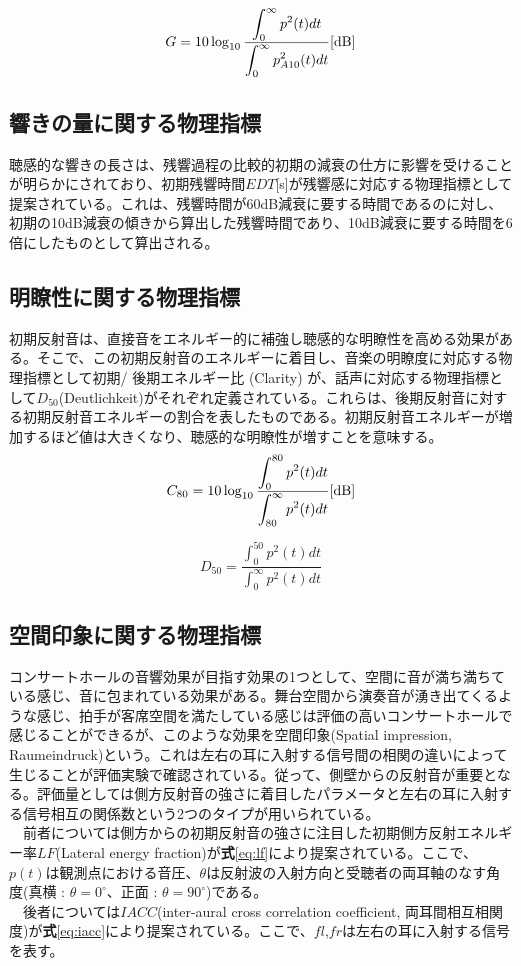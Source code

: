 \begin{equation}
  \label{eq:STG}
  G = 10\log_{10}{\frac{\displaystyle\int_0^{\infty}p^2(t)dt}{\displaystyle\int_0^{\infty}p_{A10}^2(t)dt}} \textrm{[dB]}
\end{equation}

\subsection{響きの量に関する物理指標}
聴感的な響きの長さは、残響過程の比較的初期の減衰の仕方に影響を受けることが明らかにされており、初期残響時間$EDT$[s]が残響感に対応する物理指標として提案されている。これは、残響時間が60dB減衰に要する時間であるのに対し、初期の10dB減衰の傾きから算出した残響時間であり、10dB減衰に要する時間を6倍にしたものとして算出される。

\subsection{明瞭性に関する物理指標}
初期反射音は、直接音をエネルギー的に補強し聴感的な明瞭性を高める効果がある。そこで、この初期反射音のエネルギーに着目し、音楽の明瞭度に対応する物理指標として初期/ 後期エネルギー比 \Clarity(Clarity) が、話声に対応する物理指標として$D_{50}$(Deutlichkeit)がそれぞれ定義されている。これらは、後期反射音に対する初期反射音エネルギーの割合を表したものである。初期反射音エネルギーが増加するほど値は大きくなり、聴感的な明瞭性が増すことを意味する。
\begin{equation}
    \label{eq:c80}
  C_{80} = 10\log_{10}{\frac{\displaystyle\int_0^{80}p^2(t)dt}{\displaystyle\int_{80}^{\infty}p^2(t)dt}} \textrm{[dB]}
\end{equation}

\begin{equation}
    \label{eq:c80}
  D_{50} = {\frac{\displaystyle\int_0^{50}p^2(t)dt}{\displaystyle\int_0^{\infty}p^2(t)dt}} 
\end{equation}

\subsection{空間印象に関する物理指標}
コンサートホールの音響効果が目指す効果の1つとして、空間に音が満ち満ちている感じ、音に包まれている効果がある。舞台空間から演奏音が湧き出てくるような感じ、拍手が客席空間を満たしている感じは評価の高いコンサートホールで感じることができるが、このような効果を空間印象(Spatial impression, Raumeindruck)という。これは左右の耳に入射する信号間の相関の違いによって生じることが評価実験で確認されている。従って、側壁からの反射音が重要となる。評価量としては側方反射音の強さに着目したパラメータと左右の耳に入射する信号相互の関係数という2つのタイプが用いられている。
\\　前者については側方からの初期反射音の強さに注目した初期側方反射エネルギー率$LF$(Lateral energy fraction)が\textbf{式}\ref{eq:lf}により提案されている。ここで、$p(t)$は観測点における音圧、$\theta$は反射波の入射方向と受聴者の両耳軸のなす角度(真横 : $\theta = 0^\circ$、正面 : $\theta = 90^\circ$)である。
\\　後者については$IACC$(inter-aural cross correlation coefficient, 両耳間相互相関度)が\textbf{式}\ref{eq:iacc}により提案されている。ここで、$fl$,$fr$は左右の耳に入射する信号を表す。

